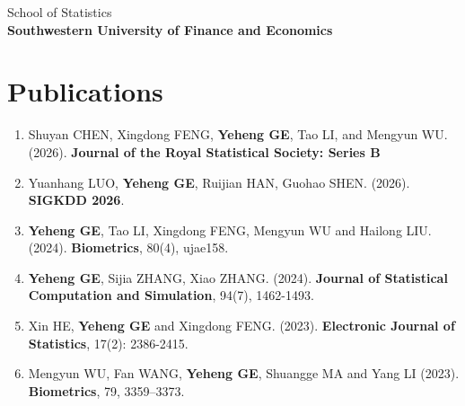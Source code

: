 \documentclass{resume}
\begin{document}
\noindent School of Statistics\\
\textbf{Southwestern University of Finance and Economics}


\section{\bf Publications} 




\begin{enumerate}





\item  	
Shuyan CHEN, 
Xingdong FENG, 
\textbf{Yeheng GE}, 
Tao LI,
and Mengyun WU.
(2026).
\textbf{Journal of the Royal Statistical Society: Series B}




\item 	
Yuanhang LUO,
\textbf{Yeheng GE},
Ruijian HAN,
Guohao SHEN.
(2026).
\textbf{SIGKDD 2026}.



\item 
\textbf{Yeheng GE}, 
Tao LI,
Xingdong FENG, 
Mengyun WU
and Hailong LIU.
(2024).
\textbf{Biometrics}, 80(4), ujae158.


\item   
\textbf{Yeheng GE}, 
Sijia ZHANG,  
Xiao ZHANG.
(2024). 
\textbf{Journal of Statistical Computation and Simulation}, 94(7), 1462-1493.



\item   
Xin HE, 
\textbf{Yeheng GE} 
and Xingdong FENG.
(2023).   
\textbf{Electronic Journal of Statistics}, 17(2): 2386-2415.



\item   
Mengyun WU, 
Fan WANG, 
\textbf{Yeheng GE}, 
Shuangge MA
and Yang LI
(2023). 
\textbf{Biometrics}, 79, 3359–3373.




\end{enumerate}
\end{document}
